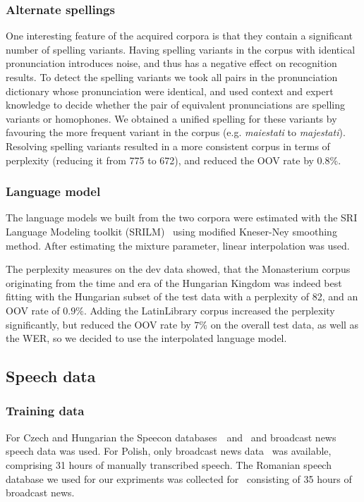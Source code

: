 \documentclass[runningheads,a4paper]{llncs}
\begin{document}
\subsubsection{Alternate spellings}
One interesting feature of the acquired corpora is that they contain a significant number of spelling variants.
Having spelling variants in the corpus with identical pronunciation introduces noise, and thus has a negative effect on recognition results.
To detect the spelling variants we took all pairs in the pronunciation dictionary whose pronunciation were identical, and used context and expert knowledge to decide whether the pair of equivalent pronunciations are spelling variants or homophones.
We obtained a unified spelling for these variants by favouring the more frequent variant in the corpus (e.g. \textit{maiestati} to \textit{majestati}).
Resolving spelling variants resulted in a more consistent corpus in terms of perplexity (reducing it from 775 to 672), and reduced the OOV rate by 0.8\%.
\subsubsection{Language model}
The language models we built from the two corpora were estimated with the SRI Language Modeling toolkit (SRILM)~\cite{srilm} using modified Kneser-Ney smoothing method.
After estimating the mixture parameter, linear interpolation was used.

The perplexity measures on the dev data showed, that the Monasterium corpus originating from the time and era of the Hungarian Kingdom was indeed best fitting with the Hungarian subset of the test data with a perplexity of 82, and an OOV rate of $0.9\%$.
Adding the LatinLibrary corpus increased the perplexity significantly, but reduced the OOV rate by $7\%$ on the overall test data, as well as the WER, so we decided to use the interpolated language model.

\subsection{Speech data}
\subsubsection{Training data}
For Czech and Hungarian the Speecon databases~\cite{czech}~and~\cite{hungarian} and broadcast news speech data was used.
For Polish, only broadcast news data~\cite{romanian} was available, comprising 31 hours of manually transcribed speech.
The Romanian speech database we used for our expriments was collected for~\cite{romanian} consisting of 35 hours of broadcast news.
\end{document}
